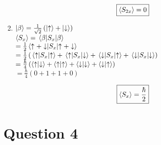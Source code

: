 \documentclass[12pt]{article}
\begin{document}
\begin{enumerate}[label=\alph*)]
\[\boxed{\ev{S_{2x}} = 0}\]

\item
$\ket{\beta} = \frac{1}{\sqrt{2}}\left(\ket{\uparrow} + \ket{\downarrow}\right)$\vspace{0.5em}\\
$\ev{S_x} = \ev{S_x}{\beta}$\vspace{0.5em}\\
\hspace*{1.9em} $ = \frac{1}{2}\ev{S_x}{\uparrow + \downarrow}$\vspace{0.5em}\\
\hspace*{1.9em} $ = \frac{1}{2}\left(\ev{S_x}{\uparrow} + \mel{\uparrow}{S_x}{\downarrow} + \mel{\downarrow}{S_x}{\uparrow} + \ev{S_x}{\downarrow}\right) $\vspace{0.5em}\\
\hspace*{1.9em} $ = \frac{\hbar}{4} \left(\braket{\uparrow}{\downarrow} + \braket{\uparrow}{\uparrow} + \braket{\downarrow}{\downarrow} + \braket{\downarrow}{\uparrow}\right)$\vspace{0.5em}\\
\hspace*{1.9em} $= \frac{\hbar}{4}\left(0+1+1+0\right)$\vspace{0.5em}

\[\boxed{\ev{S_x} = \frac{\hbar}{2}}\]

\end{enumerate}

\newpage

\section*{Question 4}
\end{document}
